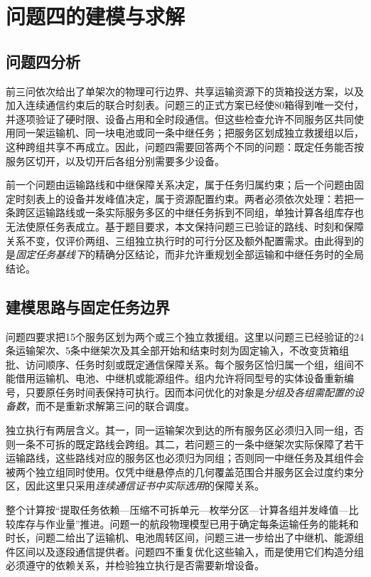 \section{问题四的建模与求解}
\subsection{问题四分析}
前三问依次给出了单架次的物理可行边界、共享运输资源下的货箱投送方案，以及加入连续通信约束后的联合时刻表。问题三的正式方案已经使80箱得到唯一交付，并逐项验证了硬时限、设备占用和全时段通信。但这些检查允许不同服务区共同使用同一架运输机、同一块电池或同一条中继任务；把服务区划成独立救援组以后，这种跨组共享不再成立。因此，问题四需要回答两个不同的问题：既定任务能否按服务区切开，以及切开后各组分别需要多少设备。

前一个问题由运输路线和中继保障关系决定，属于任务归属约束；后一个问题由固定时刻表上的设备并发峰值决定，属于资源配置约束。两者必须依次处理：若把一条跨区运输路线或一条实际服务多区的中继任务拆到不同组，单独计算各组库存也无法使原任务表成立。基于题目要求，本文保持问题三已验证的路线、时刻和保障关系不变，仅评价两组、三组独立执行时的可行分区及额外配置需求。由此得到的是\emph{固定任务基线下}的精确分区结论，而非允许重规划全部运输和中继任务时的全局结论。

\subsection{建模思路与固定任务边界}
问题四要求把15个服务区划为两个或三个独立救援组。这里以问题三已经验证的24条运输架次、5条中继架次及其全部开始和结束时刻为固定输入，不改变货箱组批、访问顺序、任务时刻或既定通信保障关系。每个服务区恰归属一个组，组间不能借用运输机、电池、中继机或能源组件。组内允许将同型号的实体设备重新编号，只要原任务时间表保持可执行。因而本问优化的对象是\emph{分组及各组需配置的设备数}，而不是重新求解第三问的联合调度。

独立执行有两层含义。其一，同一运输架次到达的所有服务区必须归入同一组，否则一条不可拆的既定路线会跨组。其二，若问题三的一条中继架次实际保障了若干运输路线，这些路线对应的服务区也必须归为同组；否则同一中继任务及其组件会被两个独立组同时使用。仅凭中继悬停点的几何覆盖范围合并服务区会过度约束分区，因此这里只采用\emph{连续通信证书中实际选用}的保障关系。

整个计算按“提取任务依赖—压缩不可拆单元—枚举分区—计算各组并发峰值—比较库存与作业量”推进。问题一的航段物理模型已用于确定每条运输任务的能耗和时长，问题二给出了运输机、电池周转区间，问题三进一步给出了中继机、能源组件区间以及逐段通信提供者。问题四不重复优化这些输入，而是使用它们构造分组必须遵守的依赖关系，并检验独立执行是否需要新增设备。

